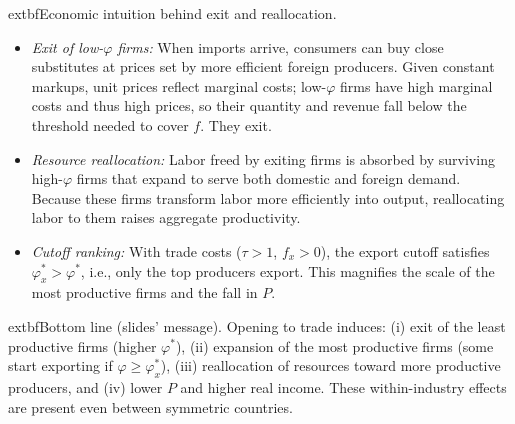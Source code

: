 \begin{solution}
\bigskip
	extbf{Economic intuition behind exit and reallocation.}
\begin{itemize}
	\item \emph{Exit of low-$\varphi$ firms:} When imports arrive, consumers can buy close substitutes at prices set by more efficient foreign producers. Given constant markups, unit prices reflect marginal costs; low-$\varphi$ firms have high marginal costs and thus high prices, so their quantity and revenue fall below the threshold needed to cover $f$. They exit.
	\item \emph{Resource reallocation:} Labor freed by exiting firms is absorbed by surviving high-$\varphi$ firms that expand to serve both domestic and foreign demand. Because these firms transform labor more efficiently into output, reallocating labor to them raises aggregate productivity.
	\item \emph{Cutoff ranking:} With trade costs ($\tau>1$, $f_x>0$), the export cutoff satisfies $\varphi_x^*>\varphi^*$, i.e., only the top producers export. This magnifies the scale of the most productive firms and the fall in $P$.
\end{itemize}

\bigskip
	extbf{Bottom line (slides’ message).}
Opening to trade induces: (i) exit of the least productive firms (higher $\varphi^*$), (ii) expansion of the most productive firms (some start exporting if $\varphi\ge\varphi_x^*$), (iii) reallocation of resources toward more productive producers, and (iv) lower $P$ and higher real income. These within-industry effects are present even between symmetric countries.

\medskip
\noindent{}
\end{solution}
